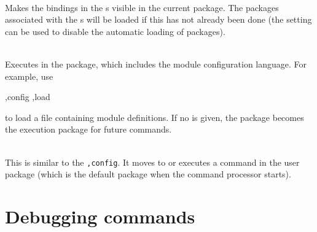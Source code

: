 \begin{description}
\item {}\\
Makes the bindings in the s visible in the current package.
The packages associated with the s will be loaded if
 this has not already been done (the  setting
 can be used to disable the automatic loading of packages).

\item {}\\
Executes  in the  package, which includes
 the module configuration language.
For example, use
\begin{example}
,config ,load 
\end{example}
to load a file containing module definitions.
If no  is given, the  package becomes the
 execution package for future commands.

\item {} \\
    This is similar to the {\tt ,config}.  It
    moves to or executes a command in the user package (which is the
    default package when the \hack{} command processor starts).

\end{description}

\section{Debugging commands}
\label{debug-commands}

